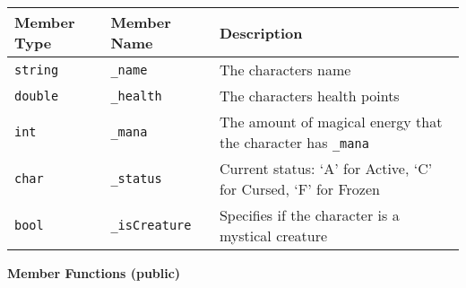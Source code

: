 \renewcommand{\arraystretch}{1.5}
\begin{longtable}{|p{1.5in}|p{1.5in}|p{2.9in}|}
\hline
\textbf{Member Type} & \textbf{Member Name} & \textbf{Description} \\ \hline

\texttt{string} & \texttt{_name} & The characters name \\ \hline

\texttt{double} & \texttt{_health} & The characters health points \\ \hline

\texttt{int} & \texttt{_mana} & The amount of magical energy that the character has \texttt{_mana} \\ \hline

\texttt{char} & \texttt{_status} & Current status: `A' for Active, `C' for Cursed, `F' for Frozen\\ \hline

\texttt{bool} & \texttt{_isCreature} & Specifies if the character is a mystical creature\\ \hline

\end{longtable}


\textbf{Member Functions (public)}

